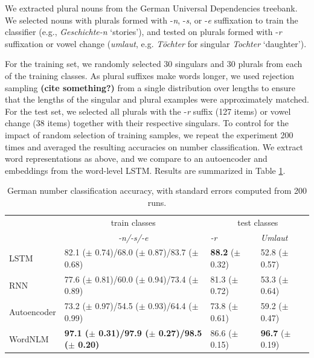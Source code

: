 We extracted plural nouns from the German Universal Dependencies
treebank\cite{de2006generating,mcdonald2013universal}.  We selected
nouns with plurals formed with -\emph{n}, -\emph{s}, or -\emph{e}
suffixation to train the classifier (e.g., \emph{Geschichte-n} `stories'), and tested on plurals formed with
-\emph{r} suffixation or vowel change (\emph{umlaut}, e.g. \emph{T{\"o}chter} for singular \emph{Tochter} `daughter').

For the training set, we randomly selected 30 singulars and 30 plurals
from each of the training classes.  As plural suffixes make words
longer, we used rejection sampling \textbf{(cite something?)} from a
single distribution over lengths to ensure that the lengths of the
singular and plural examples were approximately matched.  For the test
set, we selected all plurals with the -\emph{r} suffix (127 items) or vowel change (38 items)
together with their respective singulars. %
To
control for the impact of random selection of training samples, we
repeat the experiment 200 times and averaged the resulting accuracies
on number classification.  We extract word representations as above,
and we compare to an autoencoder and embeddings from the word-level
LSTM. Results are summarized in Table \ref{tab:number-results}.


\begin{table}[t]
  \begin{center}
    \begin{tabular}{l|l|l|l}
      &\multicolumn{1}{c}{train classes}&\multicolumn{2}{|c}{test classes}\\
      &\multicolumn{1}{c}{\emph{-n/-s/-e}}&\emph{-r}&\emph{Umlaut}\\      \hline
      LSTM& 82.1 ($\pm$ 0.74)/68.0 ($\pm$ 0.87)/83.7 ($\pm$ 0.68)  & \textbf{88.2} ($\pm$ 0.32) & 52.8 ($\pm$ 0.57) \\
      RNN& 77.6 ($\pm$ 0.81)/60.0 ($\pm$ 0.94)/73.4 ($\pm$ 0.89) & 81.3 ($\pm$ 0.72) & 53.3 ($\pm$ 0.64)\\
      Autoencoder& 73.2 ($\pm$ 0.97)/54.5 ($\pm$ 0.93)/64.4 ($\pm$ 0.99) & 73.8 ($\pm$ 0.61) & 59.2 ($\pm$ 0.47)\\
	    WordNLM& \textbf{97.1 ($\pm$ 0.31)/97.9 ($\pm$ 0.27)/98.5 ($\pm$ 0.20)} & 86.6 ($\pm$ 0.15) & \textbf{96.7} ($\pm$ 0.19)  \\ %
    \end{tabular}
  \end{center}
	\caption{\label{tab:number-results} German number classification accuracy, with standard errors computed from 200 runs.}
\end{table}

